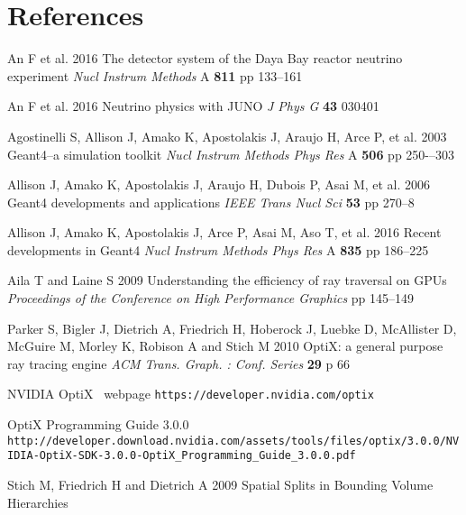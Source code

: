 \documentclass[a4paper]{jpconf}
\begin{document}





\section*{References}
\begin{thebibliography}{9}


An F et al.
2016
The detector system of the Daya Bay reactor neutrino experiment
{\it Nucl Instrum Methods} A {\bf 811} pp 133--161

An F et al.  
2016
Neutrino physics with JUNO
{\it J Phys G} {\bf 43} 030401


Agostinelli S, Allison J, Amako K, Apostolakis J, Araujo H, Arce P, et al. 
2003  
Geant4--a simulation toolkit 
{\it Nucl Instrum Methods Phys Res} A {\bf 506} pp 250-–303 

Allison J, Amako K, Apostolakis J, Araujo H, Dubois P, Asai M, et al. 
2006 
Geant4 developments and applications 
{\it IEEE Trans Nucl Sci} {\bf 53} pp 270--8

Allison J, Amako K, Apostolakis J, Arce P, Asai M, Aso T, et al. 
2016 
Recent developments in Geant4 
{\it Nucl Instrum Methods Phys Res} A {\bf 835} pp 186--225


Aila T and Laine S 
2009
Understanding the efficiency of ray traversal on GPUs
{\it Proceedings of the Conference on High Performance Graphics} pp 145--149


Parker S, Bigler J, Dietrich A, Friedrich H, Hoberock J, Luebke D, McAllister D, McGuire M, Morley K, Robison A and Stich M 
2010 
OptiX: a general purpose ray tracing engine
{\it ACM Trans. Graph. : Conf. Series} {\bf 29} p 66 

NVIDIA{\textregistered} OptiX\texttrademark~ webpage {\tt https://developer.nvidia.com/optix}

OptiX Programming Guide 3.0.0 {\tt http://developer.download.nvidia.com/assets/tools/files/optix/3.0.0/NVIDIA-OptiX-SDK-3.0.0-OptiX\_Programming\_Guide\_3.0.0.pdf}

Stich M, Friedrich H and Dietrich A 
2009
Spatial Splits in Bounding Volume Hierarchies



\end{thebibliography}
\end{document}
